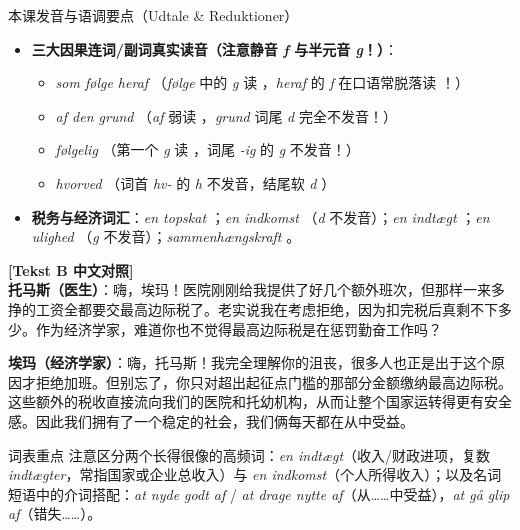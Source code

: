 \begin{tipbox}{本课发音与语调要点（Udtale \& Reduktioner）}
\begin{itemize}
  \item \textbf{三大因果连词/副词真实读音（注意静音 \textit{f} 与半元音 \textit{g}！）}：
    \begin{itemize}
      \item \textit{som følge heraf} （\textit{følge} 中的 \textit{g} 读 ，\textit{heraf} 的 \textit{f} 在口语常脱落读 ！）
      \item \textit{af den grund} （\textit{af} 弱读 ，\textit{grund} 词尾 \textit{d} 完全不发音！）
      \item \textit{følgelig} （第一个 \textit{g} 读 ，词尾 \textit{-ig} 的 \textit{g} 不发音！）
      \item \textit{hvorved} （词首 \textit{hv-} 的 \textit{h} 不发音，结尾软 \textit{d} ）
    \end{itemize}
  \item \textbf{税务与经济词汇}：\textit{en topskat} ；\textit{en indkomst} （\textit{d} 不发音）；\textit{en indtægt} ；\textit{en ulighed} （\textit{g} 不发音）；\textit{sammenhængskraft} 。
\end{itemize}
\end{tipbox}

\begin{transbox}
\small
\textbf{\color{NCDTeal}[Tekst B 中文对照]}\\
\textbf{托马斯（医生）}：嗨，埃玛！医院刚刚给我提供了好几个额外班次，但那样一来多挣的工资全都要交最高边际税了。老实说我在考虑拒绝，因为扣完税后真剩不下多少。作为经济学家，难道你也不觉得最高边际税是在惩罚勤奋工作吗？

\textbf{埃玛（经济学家）}：嗨，托马斯！我完全理解你的沮丧，很多人也正是出于这个原因才拒绝加班。但别忘了，你只对超出起征点门槛的那部分金额缴纳最高边际税。这些额外的税收直接流向我们的医院和托幼机构，从而让整个国家运转得更有安全感。因此我们拥有了一个稳定的社会，我们俩每天都在从中受益。
\end{transbox}


\begin{tipbox}{词表重点}
注意区分两个长得很像的高频词：\textit{en indtægt}（收入/财政进项，复数 \textit{indtægter}，常指国家或企业总收入）与 \textit{en indkomst}（个人所得收入）；以及名词短语中的介词搭配：\textit{at nyde godt af} / \textit{at drage nytte af}（从……中受益），\textit{at gå glip af}（错失……）。
\end{tipbox}

